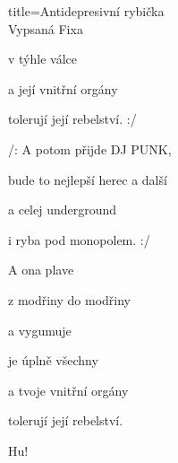 \begin{song}{title=\predtitle \centering Antidepresivní rybička \\\large Vypsaná Fixa   \vspace*{-0.3cm}}
\begin{centerjustified}
\begin{varwidth}[t]{0.48\textwidth}
  v týhle válce 

  a její vnitřní orgány

  tolerují její rebelství. :/

\sloka 
  /: A potom přijde DJ PUNK,

  bude to nejlepší herec a další 

  a celej underground 

  i ryba pod monopolem. :/

  A ona plave 
  
  z modřiny do modřiny

  a vygumuje 

  je úplně všechny

  a tvoje vnitřní orgány 

  tolerují její rebelství.

  Hu!



\end{varwidth}
\end{centerjustified}
\setcounter{Slokočet}{0}
\end{song}

